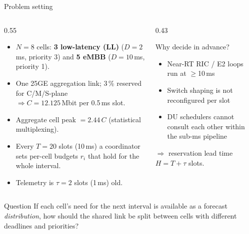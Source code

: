 \documentclass[aspectratio=169,11pt,xcolor=table]{beamer}
\begin{document}
\begin{frame}{Problem setting}
  \small
  \begin{columns}[T]
    \begin{column}{0.55\textwidth}
      \begin{itemize}
        \item $N=8$ cells: \textbf{3 low-latency (LL)} ($D=2$\,ms, priority 3) and \textbf{5 eMBB} ($D=10$\,ms, priority 1).
        \item One 25GE aggregation link; 3\,\% reserved for C/M/S-plane\\
          $\Rightarrow C = 12.125$\,Mbit per 0.5\,ms slot.
        \item Aggregate cell peak $= 2.44\,C$ (statistical multiplexing).
        \item Every $T = 20$ slots (10\,ms) a coordinator sets per-cell budgets $r_i$ that hold for the whole interval.
        \item Telemetry is $\tau = 2$ slots (1\,ms) old.
      \end{itemize}
    \end{column}
    \begin{column}{0.43\textwidth}
      \begin{block}{Why decide in advance?}
        \small
        \begin{itemize}
          \item Near-RT RIC / E2 loops run at $\ge$10\,ms
          \item Switch shaping is not reconfigured per slot
          \item DU schedulers cannot consult each other within the sub-ms pipeline
        \end{itemize}
        $\Rightarrow$ reservation lead time $H = T + \tau$ slots.
      \end{block}
    \end{column}
  \end{columns}
  \vspace{0.4em}
  \begin{alertblock}{Question}
    If each cell's need for the next interval is available as a forecast \emph{distribution}, how should the shared link be split between cells with different deadlines and priorities?
  \end{alertblock}
\end{frame}
\end{document}
